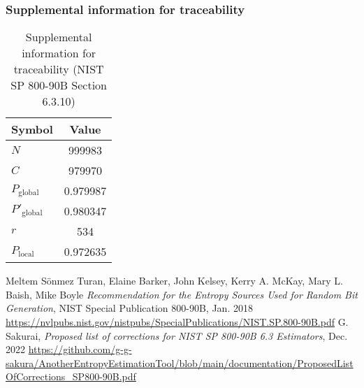 \documentclass[a3paper,xelatex,english]{bxjsarticle}
\begin{document}
\subsubsection{Supplemental information for traceability}
\renewcommand{\arraystretch}{1.8}
\begin{table}[h]
\caption{Supplemental information for traceability (NIST SP 800-90B Section 6.3.10)}
\begin{center}
\begin{tabular}{|l|c|}
\hline 
\rowcolor{anotherlightblue} %
Symbol				& Value \\ \hline 
$N$				& 999983\\ \hline 
$C$				& 979970\\ \hline 
$P_{\textrm{global}}$				& 0.979987\\ \hline 
$P'_{\textrm{global}}$			& 0.980347\\ \hline 
$r$				& 534\\ \hline 
$P_{\textrm{local}}$ 			& 0.972635\\ \hline
\end{tabular}
\end{center}
\end{table}
\renewcommand{\arraystretch}{1.4}
\begin{thebibliography}{99}
Meltem S\"{o}nmez Turan,
Elaine Barker,
John Kelsey,
Kerry A. McKay,
Mary L. Baish,
Mike Boyle
\textit{Recommendation for the Entropy Sources Used for Random Bit Generation},
NIST Special Publication 800-90B, Jan. 2018 
\url{https://nvlpubs.nist.gov/nistpubs/SpecialPublications/NIST.SP.800-90B.pdf}
G. Sakurai, \textit{Proposed list of corrections for NIST SP 800-90B 6.3 Estimators}, Dec. 2022 
\url{https://github.com/g-g-sakura/AnotherEntropyEstimationTool/blob/main/documentation/ProposedListOfCorrections_SP800-90B.pdf}
\end{thebibliography}
\end{document}
